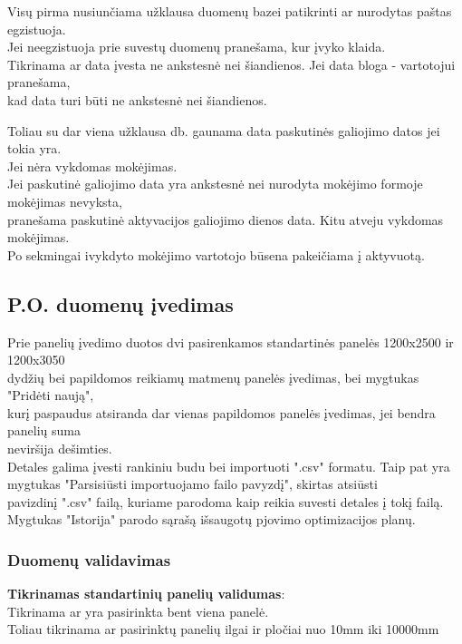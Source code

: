 \documentclass[a4paper,12pt]{article}
\begin{document}
Visų pirma nusiunčiama užklausa duomenų bazei patikrinti ar nurodytas paštas egzistuoja. \\
Jei neegzistuoja prie suvestų duomenų pranešama, kur įvyko klaida.\\

Tikrinama ar data įvesta ne ankstesnė nei šiandienos. Jei data bloga - vartotojui pranešama, \\
kad data turi būti ne ankstesnė nei šiandienos.

Toliau su dar viena užklausa db. gaunama data paskutinės galiojimo datos jei tokia yra. \\
Jei nėra vykdomas mokėjimas. \\
Jei paskutinė galiojimo data yra ankstesnė nei nurodyta mokėjimo formoje mokėjimas nevyksta, \\
pranešama paskutinė aktyvacijos galiojimo dienos data. Kitu atveju vykdomas mokėjimas. \\

Po sekmingai ivykdyto mokėjimo vartotojo būsena pakeičiama į aktyvuotą.
 
	
	
\subsection{ P.O. duomenų įvedimas }

Prie panelių įvedimo duotos dvi pasirenkamos standartinės panelės 1200x2500 ir 1200x3050\\ 
dydžių bei papildomos reikiamų matmenų panelės įvedimas, bei mygtukas "Pridėti naują", \\
kurį paspaudus atsiranda dar vienas papildomos panelės įvedimas, jei bendra panelių suma \\
neviršija dešimties. \\
Detales galima įvesti rankiniu budu bei importuoti ".csv" formatu. 
Taip pat yra mygtukas "Parsisiūsti importuojamo failo pavyzdį", skirtas atsiūsti \\
pavizdinį ".csv" failą, kuriame parodoma kaip reikia suvesti detales į tokį failą. \\
Mygtukas "Istorija" parodo sąrašą išsaugotų pjovimo optimizacijos planų.

\subsubsection{Duomenų validavimas}
\textbf{Tikrinamas standartinių panelių validumas}:\\
	Tikrinama ar yra pasirinkta bent viena panelė. \\
	Toliau tikrinama ar pasirinktų panelių ilgai ir pločiai nuo 10mm iki 10000mm \\
\end{document}
